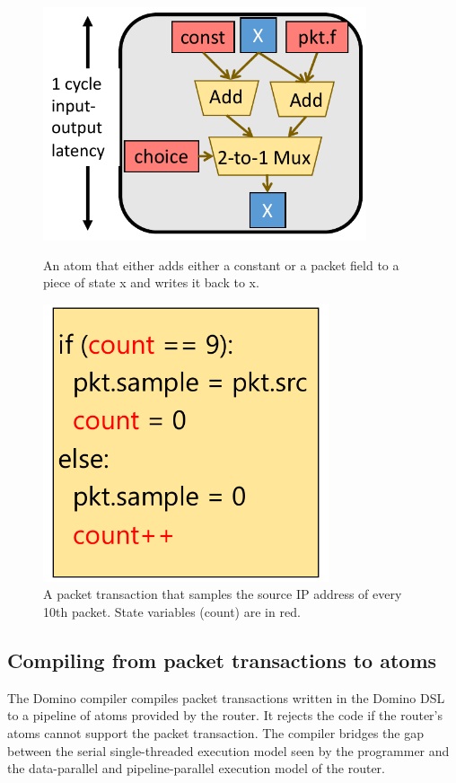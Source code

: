 \begin{figure}[!t]
\begin{minipage}{0.48\textwidth}
\centering
\vspace{0.38in}
\includegraphics[width=0.85\textwidth]{atom.pdf}
\caption{An atom that either adds either a constant or a packet field to a
piece of state x and writes it back to x.}
\label{fig:simple_atom}
\end{minipage}
\hfill
\begin{minipage}{0.48\textwidth}
\centering
\includegraphics[width=0.75\textwidth]{packet_transaction.pdf}
\caption{A packet transaction that samples the source IP address of every 10th
packet. State variables (count) are in red.}
\label{fig:simple_transaction}
\end{minipage}
\end{figure}

\subsection{Compiling from packet transactions to atoms}
The Domino compiler compiles packet transactions written in the Domino DSL to a
pipeline of atoms provided by the router. It rejects the code if the router's
atoms cannot support the packet transaction.  The compiler bridges the gap between
the serial single-threaded execution model seen by the programmer
and the data-parallel and pipeline-parallel execution model of the router.

